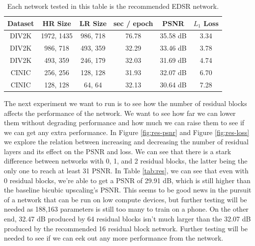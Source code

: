 \documentclass[conference]{IEEEtran}
\begin{document}
\begin{table}[htbp]
  \centering
  \caption{Each network tested in this table is the recommended EDSR network.}
  \label{tab:baseline}
  \begin{tabular}{c|c|c|c|c|c}
    Dataset & HR Size    & LR Size  & sec / epoch & PSNR     & $L_1$ Loss \\ \hline
    DIV2K   & 1972, 1435 & 986, 718 & 76.78       & 35.58 dB & 3.34       \\
    DIV2K   & 986, 718   & 493, 359 & 32.29       & 33.46 dB & 3.78       \\
    DIV2K   & 493, 359   & 246, 179 & 32.03       & 31.69 dB & 4.74       \\
    CINIC   & 256, 256   & 128, 128 & 31.93       & 32.07 dB & 6.70       \\
    CINIC   & 128, 128   & 64, 64   & 32.13       & 30.64 dB & 7.28       \\
  \end{tabular}
\end{table}

The next experiment we want to run is to see how the number of residual blocks affects the performance of the network.
We want to see how far we can lower them without degrading performance and how much we can raise them to see if we can get any extra performance.
In Figure \ref{fig:res-psnr} and Figure \ref{fig:res-loss} we explore the relation between increasing and decreasing the number of residual layers and its effect on the PSNR and loss.
We can see that there is a stark difference between networks with 0, 1, and 2 residual blocks, the latter being the only one to reach at least 31 PSNR.
In Table \ref{tab:res}, we can see that even with 0 residual blocks, we're able to get a PSNR of 29.91 dB, which is still higher than the baseline bicubic upscaling's PSNR.
This seems to be good news in the pursuit of a network that can be run on low compute devices, but further testing will be needed as 188,163 parameters is still too many to train on a phone.
On the other end, 32.47 dB produced by 64 residual blocks isn't much larger than the 32.07 dB produced by the recommended 16 residual block network.
Further testing will be needed to see if we can eek out any more performance from the network.
\end{document}
